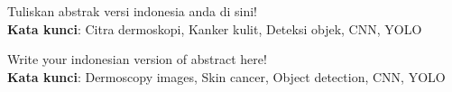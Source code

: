 \documentclass[]{mathuinsa}
\begin{document}
    \newpage{}
    \begin{onehalfspacing}\listoftables\end{onehalfspacing}


    \newpage{}
    \begin{onehalfspacing}\listoffigures\end{onehalfspacing}


    \begin{abstractind}
        Tuliskan abstrak versi indonesia anda di sini!\\
        \noindent
        \textbf{Kata kunci}: Citra dermoskopi, Kanker kulit, Deteksi objek, CNN, YOLO
    \end{abstractind}
    
    
    \begin{abstracteng}
        Write your indonesian version of abstract here!\\
        \noindent
        \textbf{Kata kunci}: Dermoscopy images, Skin cancer, Object detection, CNN, YOLO
    \end{abstracteng}

    
    
    
    
    


    


    \appendix
    \label{appendix: filter}
\end{document}

